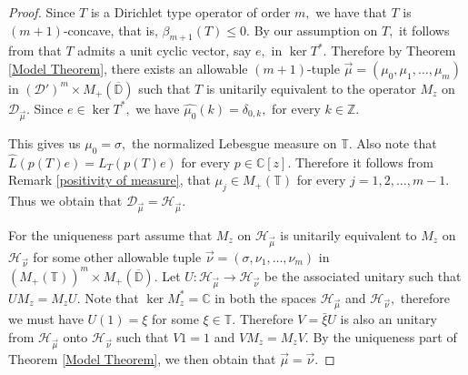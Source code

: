 \documentclass[10pt,oneside,reqno]{amsart}
\theoremstyle{definition}
\theoremstyle{remark}
\newcommand{\D}{\mathbb D}
\newcommand{\T}{\mathbb T}
\numberwithin{equation}{section}
\begin{document}
\begin{proof}
    Since $T$ is a Dirichlet type operator of order $m,$ we have that $T$ is $(m+1)$-concave, that is, $\beta_{m+1}(T)\leqslant 0.$ By our assumption on $T,$ it follows from \cite[Theorem 1.3]{GGR22} that $T$ admits a unit cyclic vector, say $e,$ in $\ker T^*.$ Therefore by Theorem \ref{Model Theorem}, there exists an allowable $(m+1)$-tuple  $\overrightarrow{\mu} = \left( \mu_0, \mu_{1}, \ldots ,\mu_{m} \right)$ in $\left (\mathcal D'\right) ^m \times M_+(\overline{\D})$ such that $T$ is unitarily equivalent to the operator $M_z$ on $\mathscr D_{\overrightarrow{\mu}}.$ Since $e\in \ker T^*,$ we have $\hat{\mu_0}(k)= \delta_{0,k},$ for every $k\in \mathbb Z.$
    
    This gives us $\mu_0=\sigma,$ the normalized Lebesgue measure on $\T.$ Also note that $\hat{L}(p(T)e)= L_T(p(T)e)$ for every $p\in\mathbb C[z].$ Therefore it follows from Remark \ref{positivity of measure}, that $\mu_j\in M_+(\mathbb T)$ for every $j=1,2,\ldots,m-1.$ Thus we obtain that $\mathscr D_{\overrightarrow{\mu}}= \mathscr H_{\overrightarrow{\mu}}.$
    
    For the uniqueness part assume that $M_z$ on $\mathscr H_{\overrightarrow{\mu}}$ is unitarily equivalent to $M_z$ on $\mathscr H_{\overrightarrow{\nu}}$ for some other allowable tuple  $\overrightarrow{\nu} = \left( \sigma, \nu_{1}, \ldots ,\nu_{m} \right)$ in  $\left(M_+(\mathbb T)\right) ^m \times M_+(\overline{\D}).$ Let $U: \mathscr H_{\overrightarrow{\mu}} \to \mathscr H_{\overrightarrow{\nu}}$ be the associated unitary such that $UM_z=M_zU.$ Note that $\ker M_z^*=\mathbb C$ in both the spaces $\mathscr H_{\overrightarrow{\mu}}$ and $\mathscr H_{\overrightarrow{\nu}},$ therefore we must have $U(1)= \xi$ for some $\xi\in \mathbb T.$ Therefore $V=\bar{\xi}U$ is also an unitary from $\mathscr H_{\overrightarrow{\mu}}$ onto $\mathscr H_{\overrightarrow{\nu}}$ such that $V1=1$ and $VM_z=M_zV.$ By the uniqueness part of Theorem \ref{Model Theorem}, we then obtain that $\overrightarrow{\mu}=\overrightarrow{\nu}.$
\end{proof}
\end{document}
